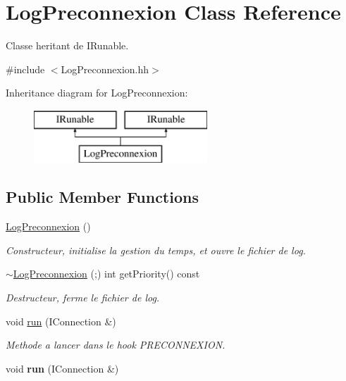 \hypertarget{class_log_preconnexion}{}\section{Log\+Preconnexion Class Reference}
\label{class_log_preconnexion}


Classe heritant de I\+Runable.  




{\ttfamily \#include $<$Log\+Preconnexion.\+hh$>$}

Inheritance diagram for Log\+Preconnexion\+:\begin{figure}[H]
\begin{center}
\leavevmode
\includegraphics[height=2.000000cm]{class_log_preconnexion}
\end{center}
\end{figure}
\subsection*{Public Member Functions}
\begin{DoxyCompactItemize}
\item 
\hypertarget{class_log_preconnexion_ac4465435f467df5da849c75cc4973825}{}\hyperlink{class_log_preconnexion_ac4465435f467df5da849c75cc4973825}{Log\+Preconnexion} ()\label{class_log_preconnexion_ac4465435f467df5da849c75cc4973825}

\begin{DoxyCompactList}\small\item\em Constructeur, initialise la gestion du temps, et ouvre le fichier de log. \end{DoxyCompactList}\item 
\hyperlink{class_log_preconnexion_ad126855be04391c9d9c1f76f72125b16}{$\sim$\+Log\+Preconnexion} (;) int get\+Priority() const 
\begin{DoxyCompactList}\small\item\em Destructeur, ferme le fichier de log. \end{DoxyCompactList}\item 
\hypertarget{class_log_preconnexion_ab91fab5e71c1816379e917dc65fde23f}{}void \hyperlink{class_log_preconnexion_ab91fab5e71c1816379e917dc65fde23f}{run} (I\+Connection \&)\label{class_log_preconnexion_ab91fab5e71c1816379e917dc65fde23f}

\begin{DoxyCompactList}\small\item\em Methode a lancer dans le hook P\+R\+E\+C\+O\+N\+N\+E\+X\+I\+O\+N. \end{DoxyCompactList}\item 
\hypertarget{class_log_preconnexion_ab91fab5e71c1816379e917dc65fde23f}{}void {\bfseries run} (I\+Connection \&)\label{class_log_preconnexion_ab91fab5e71c1816379e917dc65fde23f}

\end{DoxyCompactItemize}



